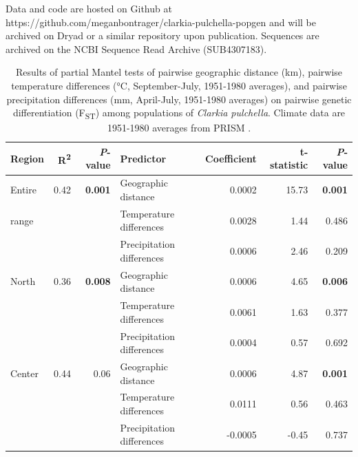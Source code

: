 \documentclass{article}
\begin{document}
Data and code are hosted on Github at https://github.com/meganbontrager/clarkia-pulchella-popgen and will be archived on Dryad or a similar repository upon publication. Sequences are archived on the NCBI Sequence Read Archive (SUB4307183).

\clearpage




\clearpage

\begin{table}[ht]
\centering
\caption[Results of partial Mantel tests of pairwise differences]{Results of partial Mantel tests of pairwise geographic distance (km), pairwise temperature differences (\si{\degree}C, September-July, 1951-1980 averages), and pairwise precipitation differences (mm, April-July, 1951-1980 averages) on pairwise genetic differentiation (F\textsubscript{ST}) among populations of \textit{Clarkia pulchella}. Climate data are 1951-1980 averages from PRISM \citep{PRISM}.}
\label{mantel}
\begin{tabular}{lrrlrrr}
\toprule
Region & R\textsuperscript{2}	& \textit{P}-value & Predictor & Coefficient & t-statistic & \textit{P}-value \\
\midrule
Entire  &	0.42 &	\textbf{0.001} &	Geographic distance &	0.0002 &	15.73 &	\textbf{0.001} \\
range	&	&	& Temperature differences &	0.0028 &	1.44 &	0.486 \\
	&	&	& Precipitation differences &	0.0006 &	2.46 &	0.209 \\
\midrule
North	& 0.36 &	\textbf{0.008} &	Geographic distance &	0.0006 &	4.65 &	\textbf{0.006} \\
	&	&	&	Temperature differences &	0.0061 &	1.63 &	0.377 \\
	&	&	&	Precipitation differences &	0.0004 &	0.57 &	0.692 \\
\midrule
Center &	0.44 &	0.06 &	Geographic distance &	0.0006 &	4.87 &	\textbf{0.001} \\
	&	&	&	Temperature differences &	0.0111 &	0.56 &	0.463 \\
	&	&	&	Precipitation differences &	-0.0005 &	-0.45 &	0.737 \\
\bottomrule
\end{tabular}
\end{table}
\end{document}
